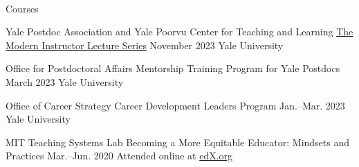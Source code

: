 \\



Courses

\begin{cventries}

  \cventry
    {Yale Postdoc Association and Yale Poorvu Center for Teaching and Learning} %
    {\href{https://ypa.yale.edu/skills-and-career-development/modern-instructor}{The Modern Instructor Lecture Series}} %
    {November 2023} %
    {Yale University} %
    {
    } 

  \cventry
    {Office for Postdoctoral Affairs} %
    {Mentorship Training Program for Yale Postdocs} %
    {March 2023} %
    {Yale University} %
    {
    }

  \cventry
    {Office of Career Strategy} %
    {Career Development Leaders Program} %
    {Jan.--Mar. 2023} %
    {Yale University} %
    {
    }

  \cventry
    {MIT Teaching Systems Lab} %
    {Becoming a More Equitable Educator: Mindsets and Practices} %
    {Mar.--Jun. 2020} %
    {Attended online at \href{www.edx.org}{edX.org}} %
    {
    }


\end{cventries}

